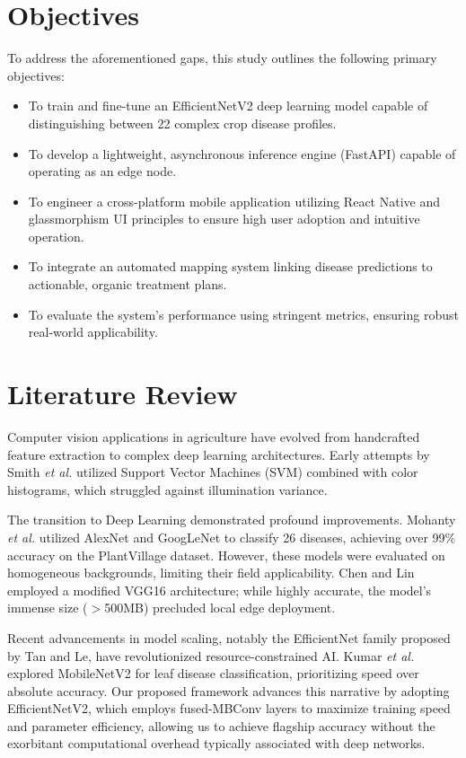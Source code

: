 \documentclass[conference]{IEEEtran}
\begin{document}
\section{Objectives}
To address the aforementioned gaps, this study outlines the following primary objectives:
\begin{itemize}
    \item To train and fine-tune an EfficientNetV2 deep learning model capable of distinguishing between 22 complex crop disease profiles.
    \item To develop a lightweight, asynchronous inference engine (FastAPI) capable of operating as an edge node.
    \item To engineer a cross-platform mobile application utilizing React Native and glassmorphism UI principles to ensure high user adoption and intuitive operation.
    \item To integrate an automated mapping system linking disease predictions to actionable, organic treatment plans.
    \item To evaluate the system's performance using stringent metrics, ensuring robust real-world applicability.
\end{itemize}

\section{Literature Review}
Computer vision applications in agriculture have evolved from handcrafted feature extraction to complex deep learning architectures. Early attempts by Smith \textit{et al.} \cite{ref1} utilized Support Vector Machines (SVM) combined with color histograms, which struggled against illumination variance.

The transition to Deep Learning demonstrated profound improvements. Mohanty \textit{et al.} \cite{ref6} utilized AlexNet and GoogLeNet to classify 26 diseases, achieving over 99\% accuracy on the PlantVillage dataset. However, these models were evaluated on homogeneous backgrounds, limiting their field applicability. Chen and Lin \cite{ref15} employed a modified VGG16 architecture; while highly accurate, the model's immense size ($>$500MB) precluded local edge deployment.

Recent advancements in model scaling, notably the EfficientNet family proposed by Tan and Le, have revolutionized resource-constrained AI. Kumar \textit{et al.} \cite{ref22} explored MobileNetV2 for leaf disease classification, prioritizing speed over absolute accuracy. Our proposed framework advances this narrative by adopting EfficientNetV2, which employs fused-MBConv layers to maximize training speed and parameter efficiency, allowing us to achieve flagship accuracy without the exorbitant computational overhead typically associated with deep networks.
\end{document}
